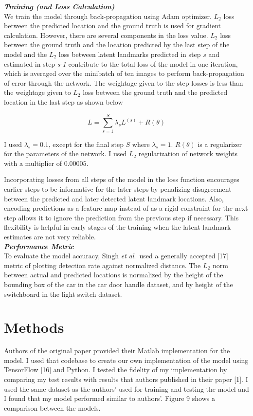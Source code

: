 \documentclass [11pt,letterpaper ,twoside ,openany ]{report}
\begin{document}
    \noindent
    \textbf{\textit{Training (and Loss Calculation)}}\\
    We train the model through back-propagation using Adam optimizer. \(L_2\) loss between the predicted location and the ground truth is used for gradient calculation. However, there are several components in the loss value. \(L_2\) loss between the ground truth and the location predicted by the last step of the model and the \(L_2\) loss between latent landmarks predicted in step \(s\) and estimated in step \textit {s-1} contribute to the total loss of the model in one iteration, which is averaged over the minibatch of ten images to perform back-propagation of error through the network. The weightage given to the step losses is less than the weightage given to \(L_2\) loss between the ground truth and the predicted location in the last step as shown below

    \[ L =  \displaystyle\sum_{s=1}^{S} \lambda _s L^{(s)} + R(\theta)\]

    \noindent
    I used \( \lambda _s = 0.1 \), except for the final step \(S\) where \( \lambda _s = 1\).  \( R(\theta) \) is a regularizer for the parameters of the network. I used \(L_2\) regularization of network weights with a multiplier of \(0.00005\). 
        
    Incorporating losses from all steps of the model in the loss function encourages earlier steps to be informative for the later steps by penalizing disagreement between the predicted and later detected latent landmark locations. Also, encoding predictions as a feature map instead of as a rigid constraint for the next step allows it to ignore the prediction from the previous step if necessary. This flexibility is helpful in early stages of the training when the latent landmark estimates are not very reliable.\\

    \noindent
    \textbf{\textit{Performance Metric}}\\
    To evaluate the model accuracy, Singh \textit{et al}.\ used a generally accepted [17] metric of plotting detection rate against normalized distance. The \(L_2\) norm between actual and predicted locations is normalized by the height of the bounding box of the car in the car door handle dataset,  and  by height of the switchboard in the light switch dataset.\\

    \chapter{Methods}
    \doublespacing
    Authors of the original paper provided their Matlab implementation for the model. I used that codebase to create our own implementation of the model using TensorFlow [16] and Python. I tested the fidelity of my implementation by comparing my test results with results that authors published in their paper [1]. I used the same dataset as the authors' used for training and testing the model and I found that my model performed similar to authors'. Figure 9 shows a comparison between the models. \\
\end{document}
